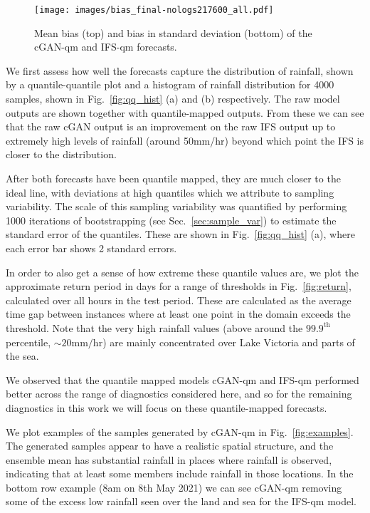 \documentclass{article}
\begin{document}
\begin{figure}
    \centering
     \texttt{[image: images/bias\_final-nologs217600\_all.pdf]}
    
     \caption{Mean bias (top) and bias in standard deviation (bottom) of the cGAN-qm and IFS-qm forecasts. }
     \label{fig:bias}
\end{figure}



 We first assess how well the forecasts capture the distribution of rainfall, shown by a quantile-quantile plot and a histogram of rainfall distribution for 4000 samples, shown in Fig.~\ref{fig:qq_hist} (a) and (b) respectively. The raw model outputs are shown together with quantile-mapped outputs. From these we can see that the raw cGAN output is an improvement on the raw IFS output up to extremely high levels of rainfall (around 50mm/hr) beyond which point the IFS is closer to the distribution. 
 

After both forecasts have been quantile mapped, they are much closer to the ideal line, with deviations at high quantiles which we attribute to sampling variability. The scale of this sampling variability was quantified by performing 1000 iterations of bootstrapping (see Sec.~\ref{sec:sample_var}) to estimate the standard error of the quantiles. These are shown in Fig.~\ref{fig:qq_hist} (a), where each error bar shows 2 standard errors.


In order to also get a sense of how extreme these quantile values are, we plot the approximate return period in days for a range of thresholds in Fig.~\ref{fig:return}, calculated over all hours in the test period. These are calculated as the average time gap between instances where at least one point in the domain exceeds the threshold. Note that the very high rainfall values (above around the $99.9^{\text{th}}$ percentile, $\sim20\text{mm/hr}$) are mainly concentrated over Lake Victoria and parts of the sea. 

We observed that the quantile mapped models cGAN-qm and IFS-qm performed better across the range of diagnostics considered here, and so for the remaining diagnostics in this work we will focus on these quantile-mapped forecasts.

We plot examples of the samples generated by cGAN-qm in Fig.~\ref{fig:examples}. The generated samples appear to have a realistic spatial structure, and the ensemble mean has substantial rainfall in places where rainfall is observed, indicating that at least some members include rainfall in those locations. In the bottom row example (8am on 8th May 2021) we can see cGAN-qm removing some of the excess low rainfall seen over the land and sea for the IFS-qm model.   
\end{document}
